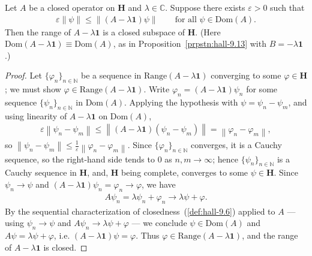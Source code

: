 \begin{proposition}
    \label{prpstn:hall-9.14}
    \leanok
    Let $A$ be a closed operator on $\mathbf{H}$ and $\lambda \in \mathbb{C}$. Suppose there exists $\varepsilon > 0$ such that
    \begin{align}
        \varepsilon \left\| \psi \right\| \le \left\| (A - \lambda \mathbf{1})\psi \right\| \qquad \text{for all } \psi \in \text{Dom}(A).
    \end{align}
    Then the range of $A - \lambda \mathbf{1}$ is a closed subspace of $\mathbf{H}$. (Here $\text{Dom}(A - \lambda \mathbf{1}) \equiv \text{Dom}(A)$, as in Proposition~\ref{prpstn:hall-9.13} with $B = -\lambda \mathbf{1}$.)
\end{proposition}
\begin{proof}
    \leanok
Let $\{ \varphi_n \}_{n \in \mathbb{N}}$ be a sequence in $\text{Range}(A - \lambda \mathbf{1})$ converging to some $\varphi \in \mathbf{H}$; we must show $\varphi \in \text{Range}(A - \lambda \mathbf{1})$. Write $\varphi_n = (A - \lambda \mathbf{1})\psi_n$ for some sequence $\{ \psi_n \}_{n \in \mathbb{N}}$ in $\text{Dom}(A)$. Applying the hypothesis with $\psi = \psi_n - \psi_m$, and using linearity of $A - \lambda\mathbf{1}$ on $\text{Dom}(A)$,
\begin{align}
    \varepsilon \left\| \psi_n - \psi_m \right\| \le \left\| (A - \lambda \mathbf{1})(\psi_n - \psi_m) \right\| = \left\| \varphi_n - \varphi_m \right\|,
\end{align}
so $\left\| \psi_n - \psi_m \right\| \le \tfrac{1}{\varepsilon} \left\| \varphi_n - \varphi_m \right\|$. Since $\{ \varphi_n \}_{n \in \mathbb{N}}$ converges, it is a Cauchy sequence, so the right-hand side tends to $0$ as $n, m \to \infty$; hence $\{ \psi_n \}_{n \in \mathbb{N}}$ is a Cauchy sequence in $\mathbf{H}$, and, $\mathbf{H}$ being complete, converges to some $\psi \in \mathbf{H}$. Since $\psi_n \to \psi$ and $(A - \lambda\mathbf{1})\psi_n = \varphi_n \to \varphi$, we have
\begin{align}
    A\psi_n = \lambda \psi_n + \varphi_n \longrightarrow \lambda \psi + \varphi.
\end{align}
By the sequential characterization of closedness~(\ref{def:hall-9.6}) applied to $A$ — using $\psi_n \to \psi$ and $A\psi_n \to \lambda\psi + \varphi$ — we conclude $\psi \in \text{Dom}(A)$ and $A\psi = \lambda \psi + \varphi$, i.e. $(A - \lambda \mathbf{1})\psi = \varphi$. Thus $\varphi \in \text{Range}(A - \lambda \mathbf{1})$, and the range of $A - \lambda \mathbf{1}$ is closed.
\end{proof}

